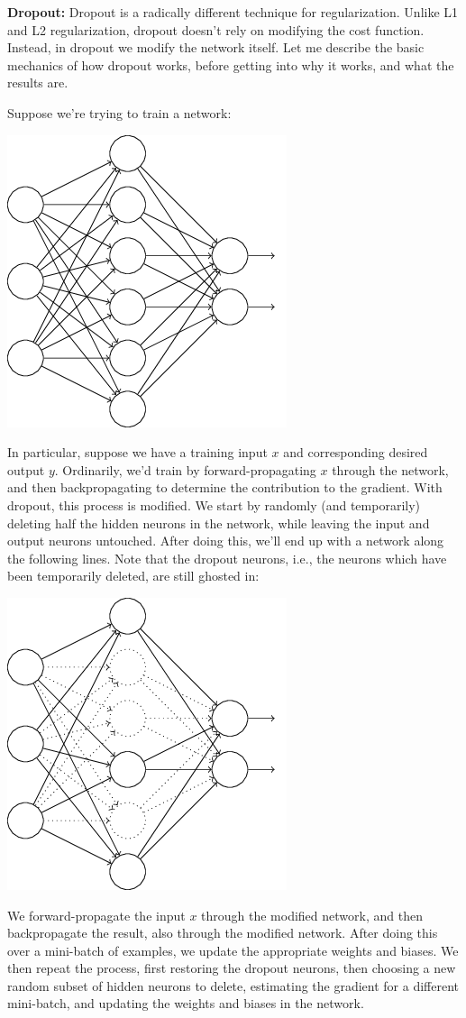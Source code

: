 \documentclass[a4paper,twoside,10pt]{book}
\begin{document}
\textbf{Dropout:}\label{dropout} Dropout is a radically different technique for regularization. Unlike L1 and L2 regularization, dropout doesn't rely on modifying the cost function. Instead, in dropout we modify the network itself. Let me describe the basic mechanics of how dropout works, before getting into why it works, and what the results are.

Suppose we're trying to train a network:
\begin{center}
	\includegraphics[width=0.45\linewidth]{figures/ch3/tikz30}
\end{center}
In particular, suppose we have a training input $x$ and corresponding desired output $y$. Ordinarily, we'd train by forward-propagating $x$ through the network, and then backpropagating to determine the contribution to the gradient. With dropout, this process is modified. We start by randomly (and temporarily) deleting half the hidden neurons in the network, while leaving the input and output neurons untouched. After doing this, we'll end up with a network along the following lines. Note that the dropout neurons, i.e., the neurons which have been temporarily deleted, are still ghosted in:
\begin{center}
	\includegraphics[width=0.45\linewidth]{figures/ch3/tikz31}
\end{center}
We forward-propagate the input $x$ through the modified network, and then backpropagate the result, also through the modified network. After doing this over a mini-batch of examples, we update the appropriate weights and biases. We then repeat the process, first restoring the dropout neurons, then choosing a new random subset of hidden neurons to delete, estimating the gradient for a different mini-batch, and updating the weights and biases in the network.
\end{document}
